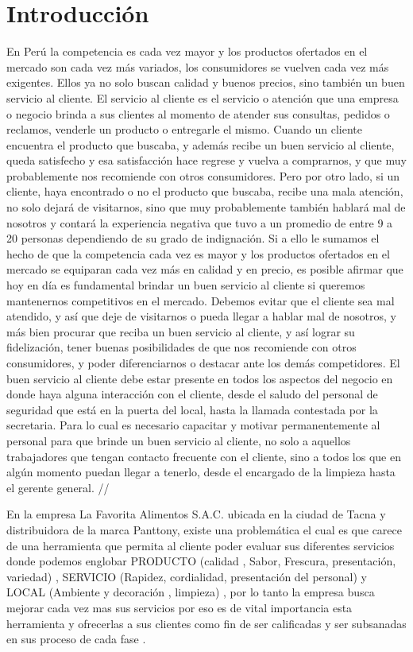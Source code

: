 \documentclass[preprint,12pt]{elsarticle}
\begin{document}
\section{Introducción}
En Perú la competencia es cada vez mayor y los productos ofertados en el mercado son cada vez más variados, los consumidores se vuelven cada vez más exigentes. Ellos ya no solo buscan calidad y buenos precios, sino también un buen servicio al cliente.
El servicio al cliente es el servicio o atención que una empresa o negocio brinda a sus clientes al momento de atender sus consultas, pedidos o reclamos, venderle un producto o entregarle el mismo.
Cuando un cliente encuentra el producto que buscaba, y además recibe un buen servicio al cliente, queda satisfecho y esa satisfacción hace regrese y vuelva a comprarnos, y que muy probablemente nos recomiende con otros consumidores.
Pero por otro lado, si un cliente, haya encontrado o no el producto que buscaba, recibe una mala atención, no solo dejará de visitarnos, sino que muy probablemente también hablará mal de nosotros y contará la experiencia negativa que tuvo a un promedio de entre 9 a 20 personas dependiendo de su grado de indignación.
Si a ello le sumamos el hecho de que la competencia cada vez es mayor y los productos ofertados en el mercado se equiparan cada vez más en calidad y en precio, es posible afirmar que hoy en día es fundamental brindar un buen servicio al cliente si queremos mantenernos competitivos en el mercado.
Debemos evitar que el cliente sea mal atendido, y así que deje de visitarnos o pueda llegar a hablar mal de nosotros, y más bien procurar que reciba un buen servicio al cliente, y así lograr su fidelización, tener buenas posibilidades de que nos recomiende con otros consumidores, y poder diferenciarnos o destacar ante los demás competidores.
El buen servicio al cliente debe estar presente en todos los aspectos del negocio en donde haya alguna interacción con el cliente, desde el saludo del personal de seguridad que está en la puerta del local, hasta la llamada contestada por la secretaria. Para lo cual es necesario capacitar y motivar permanentemente al personal para que brinde un buen servicio al cliente, no solo a aquellos trabajadores que tengan contacto frecuente con el cliente, sino a todos los que en algún momento puedan llegar a tenerlo, desde el encargado de la limpieza hasta el gerente general.
//

En la empresa La Favorita Alimentos S.A.C. ubicada en la ciudad de Tacna y distribuidora de la marca Panttony, existe una problemática el cual es que carece de una herramienta que permita al cliente poder evaluar sus diferentes servicios donde podemos englobar PRODUCTO (calidad , Sabor, Frescura, presentación, variedad) , SERVICIO (Rapidez, cordialidad, presentación del personal) y LOCAL (Ambiente y decoración , limpieza) , por lo tanto la empresa busca mejorar cada vez mas sus servicios por eso es de vital importancia esta herramienta y ofrecerlas a sus clientes como fin de ser calificadas y ser subsanadas en sus proceso de cada fase .
\end{document}
